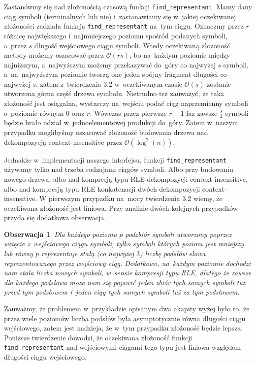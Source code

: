\documentclass[declaration,shortabstract]{iithesis}
\theoremstyle{definition} \newtheorem{definition}{Definicja}[chapter]
\theoremstyle{plain} \newtheorem{remark}[definition]{Obserwacja}
\theoremstyle{plain} \newtheorem{theorem}[definition]{Twierdzenie}
\theoremstyle{plain} \newtheorem{example}{Przykład}[definition]
\theoremstyle{plain} \newtheorem{lemma}[definition]{Lemat}
\begin{document}
Zastanówmy się nad złożonością czasową funkcji \texttt{find\_representant}. Mamy dany ciąg symboli (terminalnych lub nie) i~zastanawiamy się w~jakiej oczekiwanej złożoności zadziała funkcja \texttt{find\_representant} na~tym ciągu. Oznaczmy przez $r$ różnicę największego i~najmniejszego poziomu spośród podanych symboli, a~przez $s$ długość wejściowego ciągu symboli. Wtedy oczekiwaną złożoność metody możemy oszacować przez $\mathcal{O}(rs)$, bo na~każdym poziomie między najniższym, a~najwyższym możemy przekazywać do~góry co najwyżej $s$ symboli, a~na~najwyższym poziomie tworzą one jeden spójny fragment długości co najwyżej $s$, zatem z~twierdzenia 3.2 w~oczekiwanym czasie $\mathcal{O}(s)$ zostanie utworzona górna część drzewa symbolu. Nietrudno też zauważyć, że taka złożoność jest osiągalna, wystarczy na~wejściu podać ciąg naprzemienny symboli o~poziomie równym $0$ oraz $r$. Wówczas przez pierwsze $r-1$ faz zawsze $\frac{s}{2}$ symboli będzie brało udział w~jednoelementowej produkcji do~góry. Zatem w~naszym przypadku moglibyśmy oszacować złożoność budowania drzewa nad dekompozycją context-insensitive przez $\mathcal{O}(\log^2(n))$.

Jednakże w~implementacji naszego interfejsu, funkcji \texttt{find\_representant} używamy tylko nad trzeba rodzajami ciągów symboli. Albo przy budowaniu nowego drzewa, albo nad kompresją typu RLE dekompozycji context-insensitive, albo nad kompresją typu RLE konkatenacji dwóch dekompozycji context-insensitive. W pierwszym przypadku na~mocy twierdzenia 3.2 wiemy, że oczekiwana złożoność jest liniowa. Przy analizie dwóch kolejnych przypadków przyda się dodatkowa obserwacja.

\begin{remark}
    Dla każdego poziomu $p$ podzbiór symboli utworzony poprzez wzięcie z~wejściowego ciągu symboli, tylko symboli których poziom jest mniejszy lub równy $p$ reprezentuje stałą (co najwyżej $3$) liczbę podsłów słowa reprezentowanego przez wejściowy ciąg. Dodatkowo, na~każdym poziomie dochodzi nam stała liczba nowych symboli, w~sensie kompresji typu RLE, dlatego że zawsze dla każdego podsłowa może nam się pojawić jeden zbiór tych samych symboli tuż przed tym podsłowem i~jeden ciąg tych samych symboli tuż za tym podsłowem.
\end{remark}

Zauważmy, że problemem w~przykładzie opisanym dwa akapity wyżej było to, że przez wiele poziomów liczba podsłów była asymptotycznie równa długości ciągu wejściowego, zatem jest nadzieja, że w~tym przypadku złożoność będzie lepsza. Poniższe twierdzenie dowodzi, że oczekiwana złożoność funkcji \texttt{find\_representant} nad wejściowymi ciągami tego typu jest liniowa względem długości ciągu wejściowego.
\end{document}
